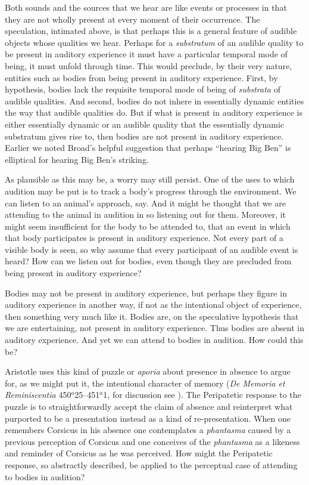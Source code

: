 Both sounds and the sources that we hear are like events or processes in that they are not wholly present at every moment of their occurrence. The speculation, intimated above, is that perhaps this is a general feature of audible objects whose qualities we hear. Perhaps for a \emph{substratum} of an audible quality to be present in auditory experience it must have a particular temporal mode of being, it must unfold through time. This would preclude, by their very nature, entities such as bodies from being present in auditory experience. First, by hypothesis, bodies lack the requisite temporal mode of being of \emph{substrata} of audible qualities. And second, bodies do not inhere in essentially dynamic entities the way that audible qualities do. But if what is present in auditory experience is either essentially dynamic or an audible quality that the essentially dynamic substratum gives rise to, then bodies are not present in auditory experience. Earlier we noted Broad's helpful suggestion that perhaps ``hearing Big Ben'' is elliptical for hearing Big Ben's striking.

As plausible as this may be, a worry may still persist. One of the uses to which audition may be put is to track a body's progress through the environment. We can listen to an animal's approach, say. And it might be thought that we are attending to the animal in audition in so listening out for them. Moreover, it might seem insufficient for the body to be attended to, that an event in which that body participates is present in auditory experience. Not every part of a visible body is seen, so why assume that every participant of an audible event is heard? How can we listen out for bodies, even though they are precluded from being present in auditory experience? 

Bodies may not be present in auditory experience, but perhaps they figure in auditory experience in another way, if not as the intentional object of experience, then something very much like it. Bodies are, on the speculative hypothesis that we are entertaining, not present in auditory experience. Thus bodies are absent in auditory experience. And yet we can attend to bodies in audition. How could this be? 

Aristotle uses this kind of puzzle or \emph{aporia} about presence in absence to argue for, as we might put it, the intentional character of memory (\emph{De Memoria et Reminiscentia} 450\( ^{a} \)25--451\( ^{a} \)1, for discussion see \citealt{Sorabji:2004qa}). The Peripatetic response to the puzzle is to straightforwardly accept the claim of absence and reinterpret what purported to be a presentation instead as a kind of re-presentation. When one remembers Corsicus in his absence one contemplates a \emph{phantasma} caused by a previous perception of Corsicus and one conceives of the \emph{phantasma} as a likeness and reminder of Corsicus as he was perceived. How might the Peripatetic response, so abstractly described, be applied to the perceptual case of attending to bodies in audition? 

